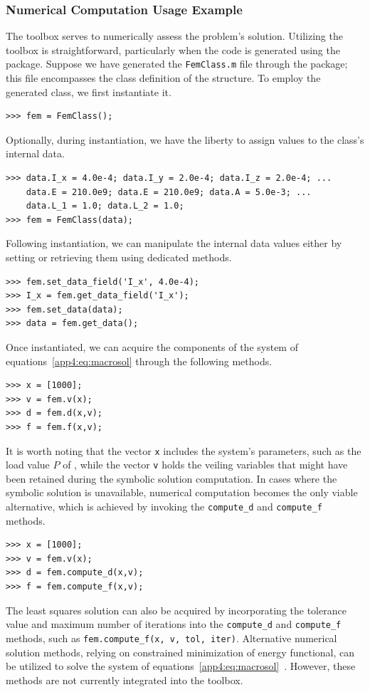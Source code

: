 \subsubsection{Numerical Computation Usage Example}

The \TrussMe{} \Matlab{} toolbox serves to numerically assess the problem's solution. Utilizing the toolbox is straightforward, particularly when the code is generated using the \TrussMe{} \Maple{} package. Suppose we have generated the \texttt{FemClass.m} file through the \TrussMe{} \Maple{} package; this file encompasses the class definition of the structure. To employ the generated class, we first instantiate it.
%
\begin{verbatim}
>>> fem = FemClass();
\end{verbatim}
%
Optionally, during instantiation, we have the liberty to assign values to the class's internal data.
%
\begin{verbatim}
>>> data.I_x = 4.0e-4; data.I_y = 2.0e-4; data.I_z = 2.0e-4; ...
    data.E = 210.0e9; data.E = 210.0e9; data.A = 5.0e-3; ...
    data.L_1 = 1.0; data.L_2 = 1.0;
>>> fem = FemClass(data);
\end{verbatim}
%
Following instantiation, we can manipulate the internal data values either by setting or retrieving them using dedicated methods.
%
\begin{verbatim}
>>> fem.set_data_field('I_x', 4.0e-4);
>>> I_x = fem.get_data_field('I_x');
>>> fem.set_data(data);
>>> data = fem.get_data();
\end{verbatim}
%
Once instantiated, we can acquire the components of the system of equations~\eqref{app4:eq:macrosol} through the following methods.
%
\begin{verbatim}
>>> x = [1000];
>>> v = fem.v(x);
>>> d = fem.d(x,v);
>>> f = fem.f(x,v);
\end{verbatim}
%
It is worth noting that the vector \texttt{x} includes the system's parameters, such as the load value $P$ of , while the vector \texttt{v} holds the veiling variables that might have been retained during the symbolic solution computation. In cases where the symbolic solution is unavailable, numerical computation becomes the only viable alternative, which is achieved by invoking the \texttt{compute\_d} and \texttt{compute\_f} methods.
%
\begin{verbatim}
>>> x = [1000];
>>> v = fem.v(x);
>>> d = fem.compute_d(x,v);
>>> f = fem.compute_f(x,v);
\end{verbatim}
%
The least squares solution can also be acquired by incorporating the tolerance value and maximum number of iterations into the \texttt{compute\_d} and \texttt{compute\_f} methods, such as \texttt{fem.compute\_f(x, v, tol, iter)}. Alternative numerical solution methods, relying on constrained minimization of energy functional, can be utilized to solve the system of equations~\eqref{app4:eq:macrosol}~\cite{hutton2004fundamentals}. However, these methods are not currently integrated into the \TrussMe{} \Matlab{} toolbox.

